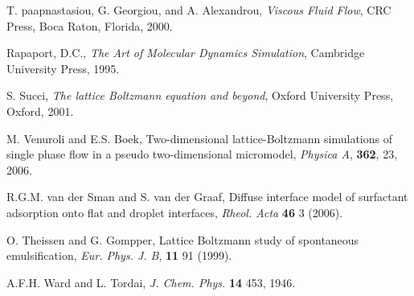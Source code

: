 \begin{thebibliography}{99}
T. paapnastasiou, G. Georgiou, and A. Alexandrou,
\textit{Viscous Fluid Flow},
CRC Press, Boca Raton, Florida, 2000.

Rapaport, D.C., \textit{The Art of Molecular Dynamics Simulation},
Cambridge University Press, 1995.

S. Succi, \textit{The lattice Boltzmann equation and beyond},
Oxford University Press, Oxford, 2001.

M. Venuroli and E.S. Boek,
Two-dimensional lattice-Boltzmann simulations of single phase
flow in a pseudo two-dimensional micromodel,
\textit{Physica A}, \textbf{362}, 23, 2006.

R.G.M. van der Sman and S. van der Graaf,
Diffuse interface model of surfactant adsorption onto flat and
droplet interfaces,
\textit{Rheol. Acta} \textbf{46} 3 (2006).

O. Theissen and G. Gompper,
Lattice Boltzmann study of spontaneous emulsification,
\textit{Eur. Phys. J. B}, \textbf{11} 91 (1999).

A.F.H. Ward and L. Tordai,
\textit{J. Chem. Phys.} \textbf{14} 453, 1946.

\end{thebibliography}




